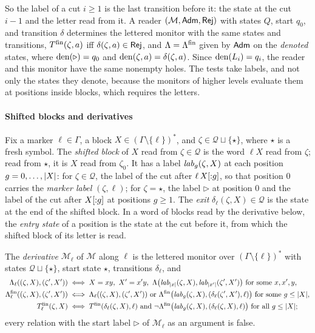 So the label of a cut $i\ge1$ is the last transition before it: the state at
the cut $i-1$ and the letter read from it. A reader $(\mathcal M,\mathsf{Adm},\mathsf{Rej})$
with states $Q$, start $q_0$, and transition $\delta$ determines the lettered
monitor with the same states and transitions, $T^{\mathrm{fin}}(\zeta,a)$ iff
$\delta(\zeta,a)\in\mathsf{Rej}$, and $\Lambda=\Lambda^{\mathrm{fin}}$ given by $\mathsf{Adm}$ on the
\emph{denoted} states, where $\operatorname{den}(\triangleright)=q_0$ and
$\operatorname{den}(\zeta,a)=\delta(\zeta,a)$. Since $\operatorname{den}(L_i)=q_i$, the reader and this
monitor have the same nonempty holes. The tests take labels, and not only the
states they denote, because the monitors of higher levels evaluate them at
positions inside blocks, which requires the letters.

\paragraph{Shifted blocks and derivatives}
Fix a marker $\ell\in\Gamma$, a block $X\in(\Gamma\setminus\{\ell\})^*$, and
$\zeta\in\mathcal Q\sqcup\{\star\}$, where $\star$ is a fresh symbol. The
\emph{shifted block} of $X$ read from $\zeta\in\mathcal Q$ is the word $\ell X$
read from $\zeta$; read from $\star$, it is $X$ read from $\zeta_0$. It has a
label $\mathit{lab}_g(\zeta,X)$ at each position $g=0,\ldots,\lvert X\rvert$: for
$\zeta\in\mathcal Q$, the label of the cut after $\ell\,X[{:}g]$, so that
position $0$ carries the \emph{marker label} $(\zeta,\ell)$; for $\zeta=\star$,
the label $\triangleright$ at position $0$ and the label of the cut after
$X[{:}g]$ at positions $g\ge1$. The \emph{exit} $\delta_\ell(\zeta,X)\in\mathcal
Q$ is the state at the end of the shifted block. In a word of blocks read by
the derivative below, the \emph{entry state} of a position is the state at the
cut before it, from which the shifted block of its letter is read.

\begin{definition}\label{def:bg-derivative}
The \emph{derivative} $\mathcal M_\ell$ of $\mathcal M$ along $\ell$ is the
lettered monitor over $(\Gamma\setminus\{\ell\})^*$ with states $\mathcal
Q\sqcup\{\star\}$, start state $\star$, transitions $\delta_\ell$, and
\[
\begin{aligned}
 \Lambda_\ell((\zeta,X),(\zeta',X'))&\iff X=xy,\ X'=x'y,\
   \Lambda\bigl(\lab_{\len x}(\zeta,X),\lab_{\len{x'}}(\zeta',X')\bigr)
   \text{ for some }x,x',y,\\
 \Lfin_\ell((\zeta,X),(\zeta',X'))&\iff \Lambda_\ell((\zeta,X),(\zeta',X'))
   \ \text{or}\ \Lfin\bigl(\lab_g(\zeta,X),(\delta_\ell(\zeta',X'),\ell)\bigr)
   \text{ for some }g\le\len X,\\
 \Tfin_\ell(\zeta,X)&\iff \Tfin(\delta_\ell(\zeta,X),\ell)\ \text{and}\
   \neg\Lfin\bigl(\lab_g(\zeta,X),(\delta_\ell(\zeta,X),\ell)\bigr)
   \text{ for all }g\le\len X;
\end{aligned}
\]
every relation with the start label $\triangleright$ of $\mathcal M_\ell$ as an
argument is false.
\end{definition}

